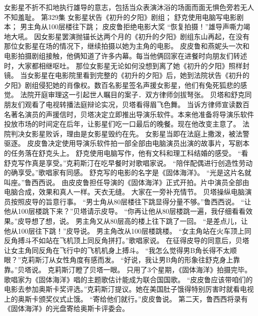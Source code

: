 \documentclass[a4paper,12pt,UTF8,twoside]{ctexbook}
\begin{document}
        女影星不折不扣地执行雄导的意志，包括当众表演沐浴的场面而面无惧色旁若无人不知羞耻。          第329集  
        女影星状告《初升的夕阳》剧组；  
        舒克使用电脑写电影剧本；  
        男主角从100层楼往下跳；  
        皮皮鲁拒绝电影大奖    
        “恢复拍摄！”雄导声嘶力竭地大吼。  
        因女影星罢演抛锚长达两个月的《初升的夕阳》剧组东山再起，在没有那位女影星在场的情况下，继续拍摄以她为主角的电影。  
        皮皮鲁和燕妮头一次和电影拍摄剧组接触，他俩知道了许多内幕。每当他俩回家在进餐时向朋友们转述时，大家都相继呕吐。  
        那位女影星无论如何没想到离了她《初升的夕阳》照样封镜。  
        当女影星在电影院里看到完整的《初升的夕阳》后，她到法院状告《初升的夕阳》剧组侵犯她的肖像权。数百名影星签名声援女影星，他们有兔死狐悲的感觉。  
        法院开庭审理这一引起世人瞩目的案子．双方律师剑拔弩张。  
        贝塔和舒克同朋友们观看了电视转播法庭辩论实况，贝塔看得眉飞色舞。  
        当诉方律师宣读数百名著名演员的声援信时，贝塔决定立即推出导演乐软件。本来他准备将导演乐软件投放市场的时间定在后年，让影星们吃一口最后的晚餐。现在他改变主意了。  
        法院判决女影星败诉，理由是女影星毁约在先。  
        女影星当即在法庭上撒泼，被法警驱逐。  
        皮皮鲁决定使用导演乐软件拍一部全部由电脑演员出演的故事片，写剧本的任务落在舒克头上。  
        舒克使用电脑写作，他有文科和理工科结婚的感受。  
        “看舒克写作真是享受。”克莉斯汀在吃早餐时对歌唱家说。  
        “陪伴配偶进行创造性劳动的确享受。”歌唱家有同感。  
        舒克写的电影的名字是《固体海洋》。  
        “光是这片名就叫座。”鲁西西说。  
        由皮皮鲁担任导演的《固体海洋》正式开拍。片中演员全部由电脑合成，效果和真人一样。天衣无缝。  
        大家在一旁补充情节。  
        贝塔操纵电脑演员按照皮导的旨意行事。  
        “男士角从80层楼往下跳显得分量不够。”鲁西西说。  
        “让他从100层楼跳下来？”贝塔请示皮导。  
        “你再让他从80层楼跳一遍，我仔细看看效果。”皮导想了想，说。  
        男主角又从80层高的楼上往下跳了一回。  
        “是差点儿，让他从100层往下跳！”皮导说。  
        男主角改从100层楼跳楼。  
        “女主角站在火车顶上同反角搏斗不如站在飞机顶上同反角拼打。”歌唱家说。  
        在征得皮导的同意后，贝塔让女主角同反角在飞行中的飞机机身上搏斗。  
        “我怎么觉得男B角长得不太顺眼？”克莉斯汀从女性角度有感而发。  
        “好说，我让男B角的形象往舒克身上靠靠。”贝塔说。  
        克莉斯汀瞪了贝塔一眼。  
        只用了3个星期，《固体海洋》拍摄完毕。  
        歌唱家为《固体海洋》唱的主题歌估计能成为联合国国歌。  
        “皮皮鲁应该带咱们的电影去参加奥斯卡奖评选。”克莉斯汀提议。她在美国肚子饿得特别厉害时就看电视上的奥斯卡颁奖仪式止饿。  
        “寄给他们就行。”皮皮鲁说。  
        第二天，鲁西西将录有《固体海洋》的光盘寄给奥斯卡评委会。  
\end{document}
